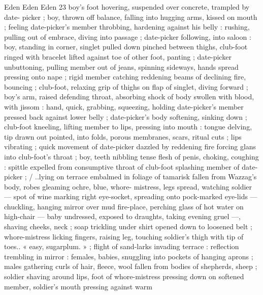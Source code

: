Eden Eden Eden 23
boy's foot hovering, suspended over concrete, trampled by date-
picker ; boy, thrown off balance, falling into hugging arms, kissed on
mouth ; feeling date-picker's member throbbing, hardening against
his belly : rushing, pulling out of embrace, diving into passage ;
date-picker following, into saloon : boy, standing in corner, singlet
pulled down pinched between thighs, club-foot ringed with bracelet
lifted against toe of other foot, panting ; date-picker unbuttoning,
pulling member out of jeans, spinning sideways, hands spread
pressing onto nape ; rigid member catching reddening beams of
declining fire, bouncing ; club-foot, relaxing grip of thighs on flap of
singlet, diving forward ; boy's arm, raised defending throat,
absorbing shock of body swollen with blood, with jissom : hand,
quick, grabbing, squeezing, holding date-picker’s member pressed
back against lower belly ; date-picker’s body softening, sinking down
; club-foot kneeling, lifting member to lips, pressing into mouth :
tongue delving, tip drawn out pointed, into folds, porous membranes,
scars, ritual cuts ; lips vibrating ; quick movement of date-picker
dazzled by reddening fire forcing glans into club-foot's throat ; boy,
teeth nibbling tense flesh of penis, choking, coughing : spittle
expelled from consumptive throat of club-foot splashing member of
date-picker ; / ..lying on terrace embalmed in foliage of tamarisk
fallen from Wazzag's body, robes gleaming ochre, blue, whore-
mistress, legs spread, watching soldier — spot of wine marking right
eye-socket, spreading onto pock-marked eye-lids — chuckling,
hanging mirror over mud fire-place, perching glass of hot water on
high-chair — baby undressed, exposed to draughts, taking evening
gruel —, shaving cheeks, neck ; soap trickling under shirt opened
down to loosened belt ; whore-mistress licking fingers, raising leg,
touching soldier's thigh with tip of toes.. « easy, sugarplum. » ; flight
of sand-larks invading terrace : reflection trembling in mirror :
females, babies, snuggling into pockets of hanging aprons ; males
gathering curls of hair, fleece, wool fallen from bodies of shepherds,
sheep ; soldier shaving around lips, foot of whore-mistress pressing
down on softened member, soldier's mouth pressing against warm

